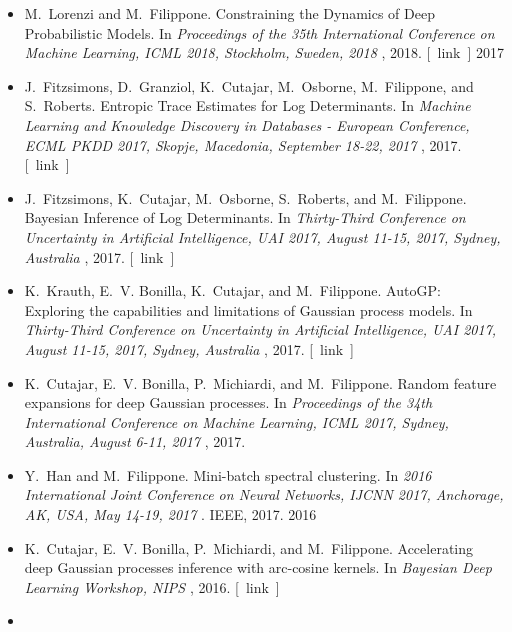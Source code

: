 \documentclass[10pt]{article}
\begin{document}
\begin{itemize}
\item 

  M. Lorenzi and M. Filippone. Constraining the Dynamics of Deep Probabilistic Models. In \emph{Proceedings of the 35th International Conference on Machine Learning, ICML 2018, Stockholm, Sweden, 2018}
, 2018. [ link ] 
2017
\item 

  J. Fitzsimons, D. Granziol, K. Cutajar, M. Osborne, M. Filippone, and S. Roberts. Entropic Trace Estimates for Log Determinants. In \emph{Machine Learning and Knowledge Discovery in Databases - European Conference, ECML PKDD 2017, Skopje, Macedonia, September 18-22, 2017}
, 2017. [ link ] 

\item 

  J. Fitzsimons, K. Cutajar, M. Osborne, S. Roberts, and M. Filippone. Bayesian Inference of Log Determinants. In \emph{Thirty-Third Conference on Uncertainty in Artificial Intelligence, UAI 2017, August 11-15, 2017, Sydney, Australia}
, 2017. [ link ] 

\item 

  K. Krauth, E. V. Bonilla, K. Cutajar, and M. Filippone. AutoGP: Exploring the capabilities and limitations of Gaussian process models. In \emph{Thirty-Third Conference on Uncertainty in Artificial Intelligence, UAI 2017, August 11-15, 2017, Sydney, Australia}
, 2017. [ link ] 

\item 

  K. Cutajar, E. V. Bonilla, P. Michiardi, and M. Filippone. Random feature expansions for deep Gaussian processes. In \emph{Proceedings of the 34th International Conference on Machine Learning, ICML 2017, Sydney, Australia, August 6-11, 2017}
, 2017. 

\item 

  Y. Han and M. Filippone. Mini-batch spectral clustering. In \emph{2016 International Joint Conference on Neural Networks, IJCNN 2017, Anchorage, AK, USA, May 14-19, 2017}
. IEEE, 2017. 
2016
\item 

  K. Cutajar, E. V. Bonilla, P. Michiardi, and M. Filippone. Accelerating deep Gaussian processes inference with arc-cosine kernels. In \emph{Bayesian Deep Learning Workshop, NIPS}
, 2016. [ link ] 

\item 


\end{itemize}
\end{document}
